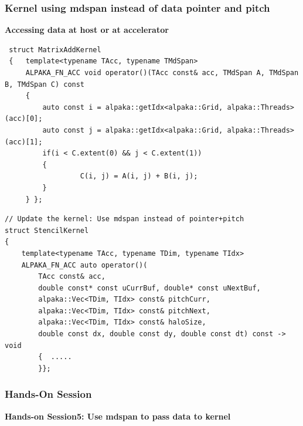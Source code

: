 \documentclass[9pt]{beamer}
\begin{document}
\begin{frame} [fragile]
\frametitle{Kernel using mdspan instead of data pointer and pitch}
\lstset{basicstyle=\ttfamily\tiny}

\textbf{Accessing data at host or at accelerator}
 \lstset{basicstyle=\ttfamily\scriptsize}
 \begin{lstlisting}
 struct MatrixAddKernel
 {   template<typename TAcc, typename TMdSpan>
     ALPAKA_FN_ACC void operator()(TAcc const& acc, TMdSpan A, TMdSpan B, TMdSpan C) const
     {
         auto const i = alpaka::getIdx<alpaka::Grid, alpaka::Threads>(acc)[0];
         auto const j = alpaka::getIdx<alpaka::Grid, alpaka::Threads>(acc)[1];
         if(i < C.extent(0) && j < C.extent(1))
         {
                  C(i, j) = A(i, j) + B(i, j);
         }
     } };
 \end{lstlisting}
\begin{lstlisting}
// Update the kernel: Use mdspan instead of pointer+pitch
struct StencilKernel
{
    template<typename TAcc, typename TDim, typename TIdx>
    ALPAKA_FN_ACC auto operator()(
        TAcc const& acc,
        double const* const uCurrBuf, double* const uNextBuf,
        alpaka::Vec<TDim, TIdx> const& pitchCurr,
        alpaka::Vec<TDim, TIdx> const& pitchNext,
        alpaka::Vec<TDim, TIdx> const& haloSize,
        double const dx, double const dy, double const dt) const -> void
        {  .....
        }};

\end{lstlisting}
\end{frame}

\begin{frame}
\frametitle{Hands-On Session}
\begin{center}
      \Huge \textbf{Hands-on Session5: Use mdspan to pass data to kernel}
  \end{center}
\end{frame}
%
\end{document}
